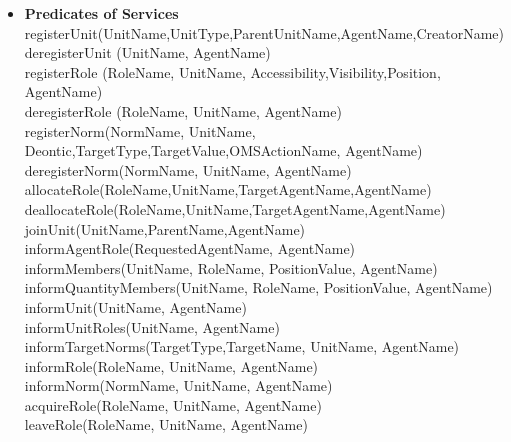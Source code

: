 \begin{itemize}
\item\textbf{Predicates of Services}
registerUnit(UnitName,UnitType,ParentUnitName,AgentName,CreatorName)\\
deregisterUnit (UnitName, AgentName)  \\
registerRole (RoleName, UnitName, Accessibility,Visibility,Position, AgentName)\\
deregisterRole (RoleName, UnitName, AgentName)\\
registerNorm(NormName, UnitName, Deontic,TargetType,TargetValue,OMSActionName, AgentName) \\
deregisterNorm(NormName, UnitName, AgentName) \\
allocateRole(RoleName,UnitName,TargetAgentName,AgentName)\\
deallocateRole(RoleName,UnitName,TargetAgentName,AgentName)\\
joinUnit(UnitName,ParentName,AgentName)\\
informAgentRole(RequestedAgentName, AgentName)\\
informMembers(UnitName, RoleName, PositionValue, AgentName)\\
informQuantityMembers(UnitName, RoleName, PositionValue, AgentName)\\
informUnit(UnitName, AgentName)\\
informUnitRoles(UnitName, AgentName)\\
informTargetNorms(TargetType,TargetName, UnitName, AgentName)\\
informRole(RoleName, UnitName, AgentName)\\
informNorm(NormName, UnitName, AgentName)\\
acquireRole(RoleName, UnitName, AgentName)\\
leaveRole(RoleName, UnitName, AgentName)\\
\end{itemize}
%
